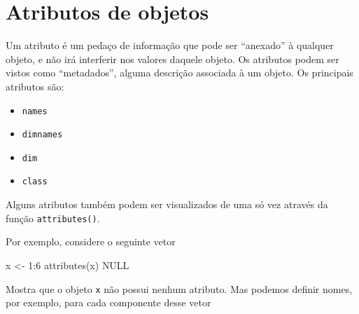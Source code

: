 \documentclass[
  10pt,
  a4paper]{book}
\newenvironment{Shaded}{\begin{snugshade}}{\end{snugshade}}
\newcommand{\ConstantTok}[1]{\textcolor[rgb]{0.00,0.00,0.00}{#1}}
\newcommand{\DecValTok}[1]{\textcolor[rgb]{0.00,0.00,0.81}{#1}}
\newcommand{\FunctionTok}[1]{\textcolor[rgb]{0.00,0.00,0.00}{#1}}
\newcommand{\NormalTok}[1]{#1}
\newcommand{\OtherTok}[1]{\textcolor[rgb]{0.56,0.35,0.01}{#1}}
\newcommand{\SpecialCharTok}[1]{\textcolor[rgb]{0.00,0.00,0.00}{#1}}
\newcommand{\StringTok}[1]{\textcolor[rgb]{0.31,0.60,0.02}{#1}}
\providecommand{\tightlist}{%
  \setlength{\itemsep}{0pt}\setlength{\parskip}{0pt}}
\begin{document}
\hypertarget{atributos-de-objetos}{%
\section{Atributos de objetos}\label{atributos-de-objetos}}

Um atributo é um pedaço de informação que pode ser ``anexado'' à qualquer
objeto, e não irá interferir nos valores daquele objeto. Os atributos
podem ser vistos como ``metadados'', alguma descrição associada à um
objeto. Os principais atributos são:

\begin{itemize}
\tightlist
\item
  \texttt{names}
\item
  \texttt{dimnames}
\item
  \texttt{dim}
\item
  \texttt{class}
\end{itemize}

Alguns atributos também podem ser visualizados de uma só vez através da
função \texttt{attributes()}.

Por exemplo, considere o seguinte vetor

\begin{Shaded}
\begin{Highlighting}[]
\NormalTok{x }\OtherTok{\textless{}{-}} \DecValTok{1}\SpecialCharTok{:}\DecValTok{6}
\FunctionTok{attributes}\NormalTok{(x)}
\ConstantTok{NULL}
\end{Highlighting}
\end{Shaded}

Mostra que o objeto \texttt{x} não possui nenhum atributo. Mas podemos definir
nomes, por exemplo, para cada componente desse vetor

\begin{Shaded}
\end{Shaded}
\end{document}
